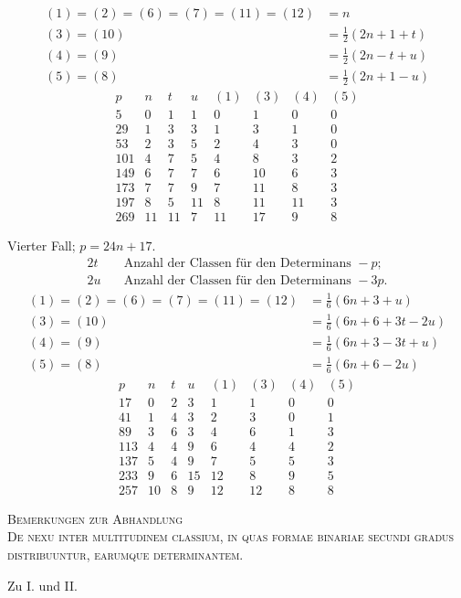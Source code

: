 %
\[
\begin{aligned}
(1)=(2)=(6)=(7)=(11)=(12)&=n\\
(3)=(10)&=\tfrac12(2n+1+t)\\
(4)=(9)&=\tfrac12(2n-t+u)\\
(5)=(8)&=\tfrac12(2n+1-u)
\end{aligned}
\]
\[
\begin{array}{r|r|r|r|r|r|r|r}
p&n&t&u&(1)&(3)&(4)&(5)\\\hline
5&0&1&1&0&1&0&0\\
29&1&3&3&1&3&1&0\\
53&2&3&5&2&4&3&0\\
101&4&7&5&4&8&3&2\\
149&6&7&7&6&10&6&3\\
173&7&7&9&7&11&8&3\\
197&8&5&11&8&11&11&3\\
269&11&11&7&11&17&9&8
\end{array}
\]

Vierter Fall; $p=24n+17$.
\[
\begin{aligned}
2t&\quad\text{Anzahl der Classen für den Determinans }-p;\\
2u&\quad\text{Anzahl der Classen für den Determinans }-3p.
\end{aligned}
\]
\[
\begin{aligned}
(1)=(2)=(6)=(7)=(11)=(12)&=\tfrac16(6n+3+u)\\
(3)=(10)&=\tfrac16(6n+6+3t-2u)\\
(4)=(9)&=\tfrac16(6n+3-3t+u)\\
(5)=(8)&=\tfrac16(6n+6-2u)
\end{aligned}
\]
\[
\begin{array}{r|r|r|r|r|r|r|r}
p&n&t&u&(1)&(3)&(4)&(5)\\\hline
17&0&2&3&1&1&0&0\\
41&1&4&3&2&3&0&1\\
89&3&6&3&4&6&1&3\\
113&4&4&9&6&4&4&2\\
137&5&4&9&7&5&5&3\\
233&9&6&15&12&8&9&5\\
257&10&8&9&12&12&8&8
\end{array}
\]

%
\par\bigskip{}
\begin{center}
\textsc{Bemerkungen zur Abhandlung}\\[1em]
\textsc{De nexu inter multitudinem classium, in quas formae binariae secundi gradus distribuuntur, earumque determinantem.}
\end{center}
\par\medskip{}\centerline{Zu I. und II.}\smallskip

